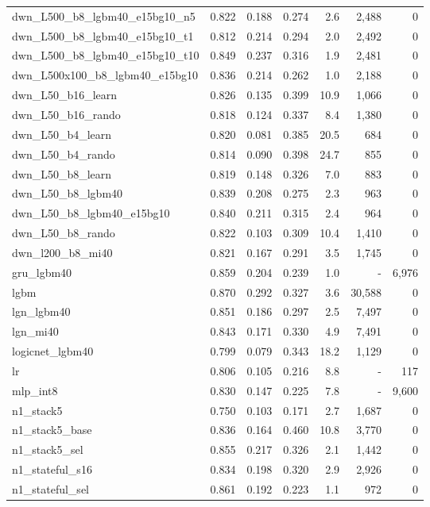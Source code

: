 \begin{table}[t]
{\begin{tabular}{lrrrrrr}
dwn\_L500\_b8\_lgbm40\_e15bg10\_n5 & 0.822 & 0.188 & 0.274 & 2.6 & 2,488 & 0 \\
dwn\_L500\_b8\_lgbm40\_e15bg10\_t1 & 0.812 & 0.214 & 0.294 & 2.0 & 2,492 & 0 \\
dwn\_L500\_b8\_lgbm40\_e15bg10\_t10 & 0.849 & 0.237 & 0.316 & 1.9 & 2,481 & 0 \\
dwn\_L500x100\_b8\_lgbm40\_e15bg10 & 0.836 & 0.214 & 0.262 & 1.0 & 2,188 & 0 \\
dwn\_L50\_b16\_learn & 0.826 & 0.135 & 0.399 & 10.9 & 1,066 & 0 \\
dwn\_L50\_b16\_rando & 0.818 & 0.124 & 0.337 & 8.4 & 1,380 & 0 \\
dwn\_L50\_b4\_learn & 0.820 & 0.081 & 0.385 & 20.5 & 684 & 0 \\
dwn\_L50\_b4\_rando & 0.814 & 0.090 & 0.398 & 24.7 & 855 & 0 \\
dwn\_L50\_b8\_learn & 0.819 & 0.148 & 0.326 & 7.0 & 883 & 0 \\
dwn\_L50\_b8\_lgbm40 & 0.839 & 0.208 & 0.275 & 2.3 & 963 & 0 \\
dwn\_L50\_b8\_lgbm40\_e15bg10 & 0.840 & 0.211 & 0.315 & 2.4 & 964 & 0 \\
dwn\_L50\_b8\_rando & 0.822 & 0.103 & 0.309 & 10.4 & 1,410 & 0 \\
dwn\_l200\_b8\_mi40 & 0.821 & 0.167 & 0.291 & 3.5 & 1,745 & 0 \\
gru\_lgbm40 & 0.859 & 0.204 & 0.239 & 1.0 & - & 6,976 \\
lgbm & 0.870 & 0.292 & 0.327 & 3.6 & 30,588 & 0 \\
lgn\_lgbm40 & 0.851 & 0.186 & 0.297 & 2.5 & 7,497 & 0 \\
lgn\_mi40 & 0.843 & 0.171 & 0.330 & 4.9 & 7,491 & 0 \\
logicnet\_lgbm40 & 0.799 & 0.079 & 0.343 & 18.2 & 1,129 & 0 \\
lr & 0.806 & 0.105 & 0.216 & 8.8 & - & 117 \\
mlp\_int8 & 0.830 & 0.147 & 0.225 & 7.8 & - & 9,600 \\
n1\_stack5 & 0.750 & 0.103 & 0.171 & 2.7 & 1,687 & 0 \\
n1\_stack5\_base & 0.836 & 0.164 & 0.460 & 10.8 & 3,770 & 0 \\
n1\_stack5\_sel & 0.855 & 0.217 & 0.326 & 2.1 & 1,442 & 0 \\
n1\_stateful\_s16 & 0.834 & 0.198 & 0.320 & 2.9 & 2,926 & 0 \\
n1\_stateful\_sel & 0.861 & 0.192 & 0.223 & 1.1 & 972 & 0 \\

\end{tabular}}
\end{table}
